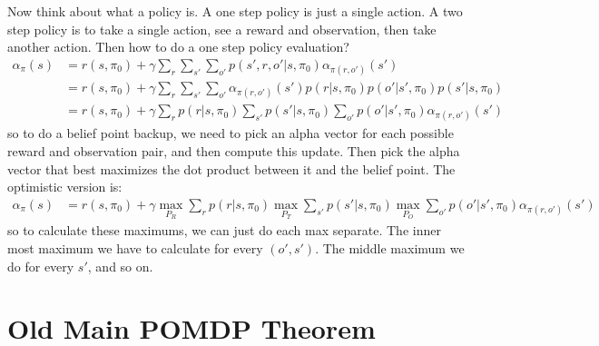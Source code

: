 \documentclass[10pt,english]{article}
\begin{document}
Now think about what a policy is. A one step policy is just a single action. A two step policy is to take a single action, see a reward and observation, then take another action. Then how to do a one step policy evaluation?
\begin{align}
\alpha_{\pi}(s) &= r(s,\pi_0) + \gamma\sum_{r}\sum_{s'}\sum_{o'}p(s',r,o'|s,\pi_0)\alpha_{\pi(r,o')}(s') \\
&= r(s,\pi_0) + \gamma\sum_{r}\sum_{s'}\sum_{o'}\alpha_{\pi(r,o')}(s')p(r|s,\pi_0)p(o'|s',\pi_0)p(s'|s,\pi_0) \\
&= r(s,\pi_0) + \gamma\sum_{r}p(r|s,\pi_0)\sum_{s'}p(s'|s,\pi_0)\sum_{o'}p(o'|s',\pi_0)\alpha_{\pi(r,o')}(s')
\end{align}
so to do a belief point backup, we need to pick an alpha vector for each possible reward and observation pair, and then compute this update. Then pick the alpha vector that best maximizes the dot product between it and the belief point. The optimistic version is:
\begin{align}
\alpha_{\pi}(s) &= r(s,\pi_0) + \gamma \max_{P_R} \sum_{r}p(r|s,\pi_0)\max_{P_T} \sum_{s'}p(s'|s,\pi_0) \max_{P_O} \sum_{o'}p(o'|s',\pi_0) \alpha_{\pi(r,o')}(s')
\end{align}
so to calculate these maximums, we can just do each max separate. The inner most maximum we have to calculate for every $(o',s')$. The middle maximum we do for every $s'$, and so on.

\section{Old Main POMDP Theorem}
\end{document}
